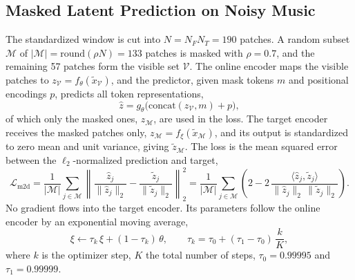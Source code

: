 \documentclass{FastFyp}
\begin{document}
\subsection{Masked Latent Prediction on Noisy Music}
The standardized window is cut into $N=N_FN_T=190$ patches. A random subset $\mathcal{M}$ of $|\mathcal{M}|=\mathrm{round}(\rho N)=133$ patches is masked with $\rho=0.7$, and the remaining 57 patches form the visible set $\mathcal{V}$. The online encoder maps the visible patches to $z_{\mathcal V}=f_\theta(\tilde{x}_{\mathcal V})$, and the predictor, given mask tokens $m$ and positional encodings $p$, predicts all token representations,
\begin{equation}
\hat{z}=g_\theta\big(\mathrm{concat}(z_{\mathcal V},m)+p\big),
\label{eq:m5-pred}
\end{equation}
of which only the masked ones, $\hat{z}_{\mathcal M}$, are used in the loss. The target encoder receives the masked patches only, $z_{\mathcal M}=f_\xi(\tilde{x}_{\mathcal M})$, and its output is standardized to zero mean and unit variance, giving $\tilde{z}_{\mathcal M}$. The loss is the mean squared error between the $\ell_2$-normalized prediction and target,
\begin{equation}
\mathcal{L}_{\mathrm{m2d}}=\frac{1}{|\mathcal{M}|}\sum_{j\in\mathcal{M}}\left\lVert\frac{\hat{z}_j}{\lVert\hat{z}_j\rVert_2}-\frac{\tilde{z}_j}{\lVert\tilde{z}_j\rVert_2}\right\rVert_2^{2}
=\frac{1}{|\mathcal{M}|}\sum_{j\in\mathcal{M}}\left(2-2\,\frac{\langle\hat{z}_j,\tilde{z}_j\rangle}{\lVert\hat{z}_j\rVert_2\,\lVert\tilde{z}_j\rVert_2}\right).
\label{eq:m5-m2d}
\end{equation}
No gradient flows into the target encoder. Its parameters follow the online encoder by an exponential moving average,
\begin{equation}
\xi\leftarrow\tau_k\,\xi+(1-\tau_k)\,\theta,\qquad
\tau_k=\tau_0+(\tau_1-\tau_0)\,\frac{k}{K},
\label{eq:m5-ema}
\end{equation}
where $k$ is the optimizer step, $K$ the total number of steps, $\tau_0=0.99995$ and $\tau_1=0.99999$.
\end{document}
